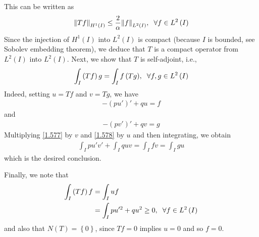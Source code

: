 \documentclass[a4paper,oneside]{book}
\numberwithin{equation}{chapter}
\begin{document}
This can be written as
\begin{align}
{\left\| {Tf} \right\|_{{H^1}\left( I \right)}} \le \frac{2}{\alpha }{\left\| f \right\|_{{L^2}\left( I \right)}},\hspace{0.2cm}\forall f \in {L^2}\left( I \right)
\end{align}
Since the injection of $H^1\left(I\right)$ into $L^2\left(I\right)$ is compact (because $I$ is bounded, see Sobolev embedding theorem), we deduce that $T$ is a compact operator from $L^2\left(I\right)$ into $L^2\left(I\right)$. Next, we show that $T$ is self-adjoint, i.e.,
\begin{align}
\int_I {\left( {Tf} \right)g}  = \int_I {f\left( {Tg} \right)} ,\hspace{0.2cm} \forall f,g \in {L^2}\left( I \right)
\end{align}
Indeed, setting $u=Tf$ and $v=Tg$, we have
\begin{align}
\label{1.577}
 - \left( {pu'} \right)' + qu = f
\end{align}
and
\begin{align}
\label{1.578}
 - \left( {pv'} \right)' + qv = g
\end{align}
Multiplying \eqref{1.577} by $v$ and \eqref{1.578} by $u$ and then integrating, we obtain
\begin{align}
\int_I {pu'v'}  + \int_I {quv}  = \int_I {fv}  = \int_I {gu} 
\end{align}
which is the desired conclusion.

Finally, we note that
\begin{align}
\label{1.580}
\int_I {\left( {Tf} \right)f}  &= \int_I {uf} \\
 &= \int_I {pu{'^2} + q{u^2}}  \ge 0,\hspace{0.2cm}\forall f \in {L^2}\left( I \right) \label{1.581}
\end{align}
and also that $N\left( T \right) = \left\{ 0 \right\}$, since $Tf=0$ implies $u=0$ and so $f=0$.
\end{document}
